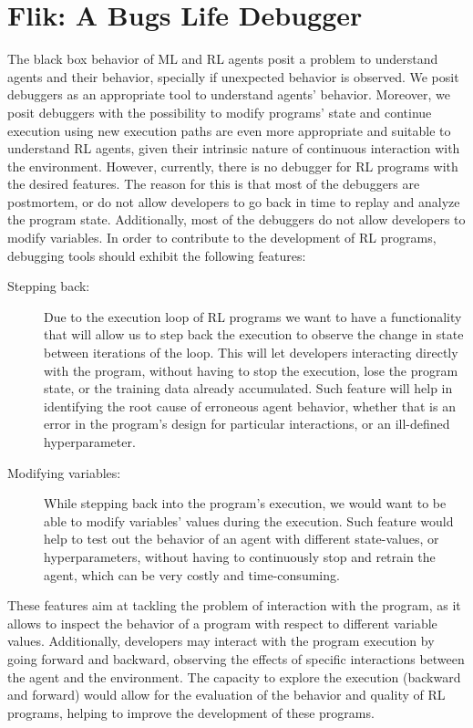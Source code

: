 
\section{Flik: A Bugs Life Debugger}
\label{sec:solution}

The black box behavior of \ac{ML} and \ac{RL} agents posit a problem to understand agents and 
their behavior, specially if unexpected behavior is observed. We posit debuggers as an appropriate 
tool to understand agents' behavior. Moreover, we posit debuggers with the possibility to modify 
programs' state and continue execution using new execution paths are even more appropriate and 
suitable to understand \ac{RL} agents, given their intrinsic nature of continuous interaction with the 
environment. However, currently, there is no debugger for \ac{RL} programs with the desired 
features. The reason for this is that most of the debuggers are postmortem, or do not allow developers
to go back in time to replay and analyze the program state. Additionally, most of the debuggers do not 
allow developers to modify variables. In order to contribute to the development of \ac{RL} programs, 
debugging tools should exhibit the following features:

\begin{description}
    \item[Stepping back:] Due to the execution loop of \ac{RL} programs we 
    want to have a functionality that will allow us to step back the execution to observe the change 
    in state between iterations of the loop. This will let developers interacting directly with the program, 
    without having to stop the execution,  lose the program state, or the training data already 
    accumulated. Such feature will help in identifying the root cause of erroneous agent behavior, 
    whether that is an error in the program's design for particular interactions, or an ill-defined 
    hyperparameter. 
    \item [Modifying variables:] While stepping back into the program's execution, we would want to be 
    able to modify variables' values during the execution. Such feature would help to test out the 
    behavior of an agent with different state-values, or hyperparameters, without having to 
    continuously stop and retrain the agent, which can be very costly and time-consuming. 
\end{description}

These features aim at tackling the problem of interaction with the program, as it allows 
to inspect the behavior of a program with respect to different variable values. Additionally, 
developers may interact with the program execution by going forward and backward, observing the 
effects of specific interactions between the agent and the environment. The capacity to explore the 
execution (backward and forward) would allow for the evaluation of the behavior and quality of 
\ac{RL} programs, helping to improve the development of these programs.

